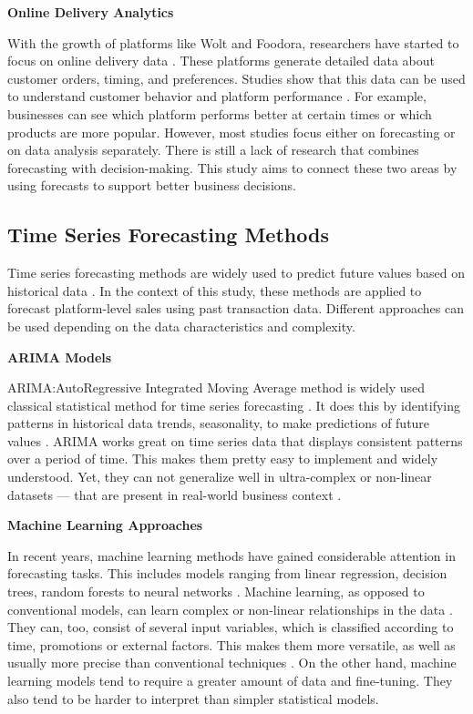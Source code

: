 \textbf{Online Delivery Analytics}

With the growth of platforms like Wolt and Foodora, researchers have started to focus on online delivery data \citep{mbare2023psychosocial}. These platforms generate detailed data about customer orders, timing, and preferences. Studies show that this data can be used to understand customer behavior and platform performance \citep{geissinger2022sharing}. For example, businesses can see which platform performs better at certain times or which products are more popular. However, most studies focus either on forecasting or on data analysis separately. There is still a lack of research that combines forecasting with decision-making. This study aims to connect these two areas by using forecasts to support better business decisions.


\subsection{Time Series Forecasting Methods}

Time series forecasting methods are widely used to predict future values based on historical data \citep{kolambe2024forecasting}. In the context of this study, these methods are applied to forecast platform-level sales using past transaction data. Different approaches can be used depending on the data characteristics and complexity.

\textbf{ARIMA Models}

ARIMA:AutoRegressive Integrated Moving Average method is widely used classical statistical method for time series forecasting \citep{arumugam2023time}. It does this by identifying patterns in historical data trends, seasonality, to make predictions of future values \citep{bektemyssova2022time}. ARIMA works great on time series data that displays consistent patterns over a period of time. This makes them pretty easy to implement and widely understood. Yet, they can not generalize well in ultra-complex or non-linear datasets — that are present in real-world business context \citep{albeladi2023time}.

\textbf{Machine Learning Approaches}

In recent years, machine learning methods have gained considerable attention in forecasting tasks. This includes models ranging from linear regression, decision trees, random forests to neural networks \citep{masini2023machine}. Machine learning, as opposed to conventional models, can learn complex or non-linear relationships in the data \citep{ahamed2023machine}. They can, too, consist of several input variables, which is classified according to time, promotions or external factors. This makes them more versatile, as well as usually more precise than conventional techniques \citep{benti2023forecasting}. On the other hand, machine learning models tend to require a greater amount of data and fine-tuning. They also tend to be harder to interpret than simpler statistical models.

